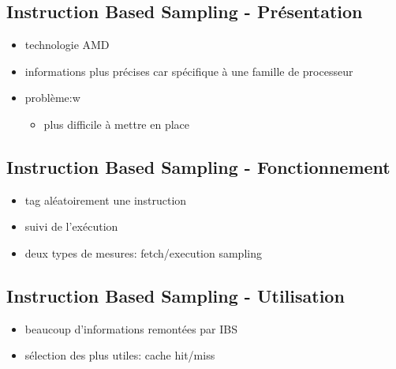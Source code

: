 \documentclass{beamer}
\newcommand{\bframe}{\begin{frame}{\secname}{\subsecname}}
\begin{document}
    \subsection{Instruction Based Sampling - Présentation}
      \bframe
        \begin{itemize}
          \item technologie AMD
          \item informations plus précises car spécifique à une famille de
            processeur
          \item problème:w
            \begin{itemize}
              \item plus difficile à mettre en place
            \end{itemize} 
        \end{itemize}
      \end{frame}

    \subsection{Instruction Based Sampling - Fonctionnement}
      \bframe
        \begin{itemize}
          \item tag aléatoirement une instruction
          \item suivi de l'exécution
          \item deux types de mesures: fetch/execution sampling
        \end{itemize}
      \end{frame}

    \subsection{Instruction Based Sampling - Utilisation}
      \bframe
        \begin{itemize}
          \item<1-2> beaucoup d'informations remontées par IBS
          \item<1-2> sélection des plus utiles: cache hit/miss
        \end{itemize}

      \end{frame}
\end{document}
